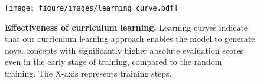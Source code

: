 \begin{figure}[t]
    \centering
    \texttt{[image: figure/images/learning\_curve.pdf]}
    \caption{\textbf{Effectiveness of curriculum learning.} Learning curves indicate that our curriculum learning approach enables the model to generate novel concepts with significantly higher absolute evaluation scores even in the early stage of training, compared to the random training. The X-axis represents training steps.}
    \vspace{-0.2in}
    \label{fig:learning_curve}
\end{figure}